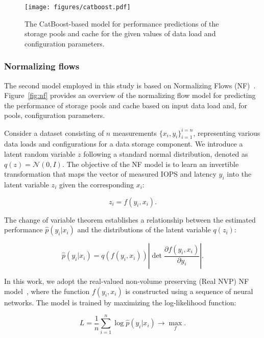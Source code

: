 \begin{figure*}
\centerline{\texttt{[image: figures/catboost.pdf]}}
\caption{The CatBoost-based model for performance predictions of the storage pools and cache for the given values of data load and configuration parameters.}
\label{fig:catboost}
\end{figure*}


\subsubsection{Normalizing flows}

The second model employed in this study is based on Normalizing Flows (NF)~\cite{JMLR:v22:19-1028}. Figure~\ref{fig:nf} provides an overview of the normalizing flow model for predicting the performance of storage pools and cache based on input data load and, for pools, configuration parameters.

Consider a dataset consisting of $n$ measurements $\{x_i, y_i\}_{i=1}^{i=n}$, representing various data loads and configurations for a data storage component. We introduce a latent random variable $z$ following a standard normal distribution, denoted as $q(z) = \mathcal{N}(0, I)$. The objective of the NF model is to learn an invertible transformation that maps the vector of measured IOPS and latency $y_i$ into the latent variable $z_i$ given the corresponding $x_i$:

\begin{equation}
z_i = f(y_i, x_i).
\end{equation}

The change of variable theorem establishes a relationship between the estimated performance $\hat{p}(y_i|x_i)$ and the distributions of the latent variable $q(z_i)$:

\begin{equation}
\hat{p}(y_i|x_i) = q(f(y_i, x_i)) \left| \det \frac{\partial f(y_i, x_i)}{\partial y_i} \right|.
\end{equation}

In this work, we adopt the real-valued non-volume preserving (Real NVP) NF model~\cite{realnvp}, where the function $f(y_i, x_i)$ is constructed using a sequence of neural networks. The model is trained by maximizing the log-likelihood function:

\begin{equation}
L = \frac{1}{n} \sum_{i=1}^{n} \log \hat{p}(y_i|x_i) \to \max_{f}.
\end{equation}

